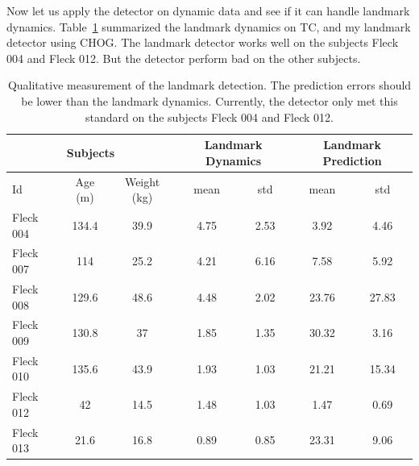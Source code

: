 

Now let us apply the detector on dynamic data and see if it can handle landmark dynamics.
Table~\ref{tab:Fleck_landmarks} summarized the landmark dynamics on TC, and my landmark detector using CHOG.
The landmark detector works well on the subjects Fleck 004 and Fleck 012.
But the detector perform bad on the other subjects.

\begin{table}
  \centering
  \begin{tabular}{|lcc|c|c|c|c|}
  \hline
  \multicolumn{3}{|c|}{Subjects} & \multicolumn{2}{|c|}{Landmark Dynamics} & \multicolumn{2}{|c|}{Landmark Prediction} \\
  \hline
  Id  & Age (m) & Weight (kg) & mean & std  & mean & std \\
  \hline
  Fleck 004 & 134.4   & 39.9  & 4.75 & 2.53 & 3.92 & 4.46 \\
  Fleck 007 & 114     & 25.2  & 4.21 & 6.16 & 7.58 & 5.92 \\
  Fleck 008 & 129.6   & 48.6  & 4.48 & 2.02 & 23.76 & 27.83 \\
  Fleck 009 & 130.8   & 37    & 1.85 & 1.35 & 30.32 & 3.16 \\
  Fleck 010 & 135.6   & 43.9  & 1.93 & 1.03 & 21.21 & 15.34 \\
  Fleck 012 &  42     & 14.5  & 1.48 & 1.03 & 1.47 & 0.69 \\
  Fleck 013 &  21.6   & 16.8  & 0.89 & 0.85 & 23.31 & 9.06 \\
  \hline
  \end{tabular}
  \caption{Qualitative measurement of the landmark detection. The prediction errors should be lower than the landmark dynamics. Currently, the detector only met this standard on the subjects Fleck 004 and Fleck 012.
   }
  \label{tab:Fleck_landmarks}
\end{table}

